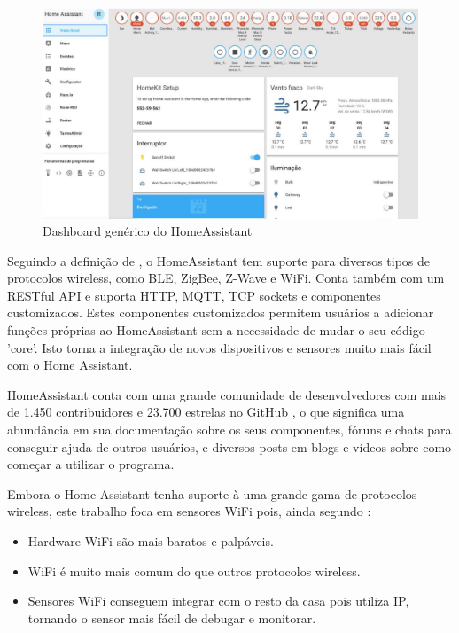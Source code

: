 \begin{figure}[htbp]
	\centering
	\includegraphics[width=1\linewidth]{figuras/homeassistant-dash.png}
	\caption{Dashboard genérico do HomeAssistant}
	\label{fig:homeassistant-dash}
\end{figure}

Seguindo a definição de \cite{Gomes2018}, o HomeAssistant tem suporte para diversos tipos de protocolos wireless, como BLE, ZigBee, Z-Wave e WiFi. Conta também com um RESTful API e suporta HTTP, MQTT, TCP sockets e componentes customizados. Estes componentes customizados permitem usuários a adicionar funções próprias ao HomeAssistant sem a necessidade de mudar o seu código 'core'. Isto torna a integração de novos dispositivos e sensores muito mais fácil com o Home Assistant.


HomeAssistant conta com uma grande comunidade de desenvolvedores com mais de 1.450 contribuidores e 23.700 estrelas no GitHub \cite{githubhomeassistant}, o que significa uma abundância em sua documentação sobre os seus componentes, fóruns e chats para conseguir ajuda de outros usuários, e diversos posts em blogs e vídeos sobre como começar a utilizar o programa.

Embora o Home Assistant tenha suporte à uma grande gama de protocolos wireless, este trabalho foca em sensores WiFi pois, ainda segundo \cite{Lundrigan2017}:

\begin{itemize}
	\item Hardware WiFi são mais baratos e palpáveis.
	\item WiFi é muito mais comum do que outros protocolos wireless.
	\item Sensores WiFi conseguem integrar com o resto da casa pois utiliza IP, tornando o sensor mais fácil de debugar e monitorar.
\end{itemize}

